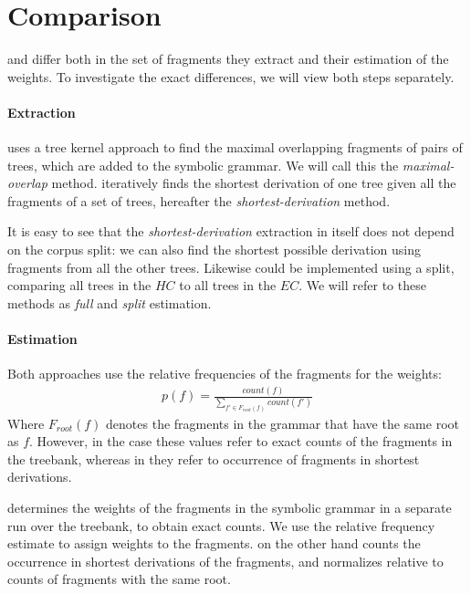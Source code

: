 
\section{Comparison} \label{sec:Comparison}
\dops{} and \ddop{} differ both in the set of fragments they extract and their estimation of the weights. To investigate the exact differences, we will view both steps separately.

\paragraph{Extraction}
\ddop{} uses a tree kernel approach to find the maximal overlapping fragments of pairs of trees, which are added to the symbolic grammar. We will call this the \emph{maximal-overlap} method. \dops{} iteratively finds the shortest derivation of one tree given all the fragments of a set of trees, hereafter the \emph{shortest-derivation} method. 

It is easy to see that the \emph{shortest-derivation} extraction in itself does not depend on the corpus split: we can also find the shortest possible derivation using fragments from all the other trees. Likewise \ddop{} could be implemented using a split, comparing all trees in the $HC$ to all trees in the $EC$.
We will refer to these methods as \emph{full} and \emph{split} estimation.

\paragraph{Estimation}

Both approaches use the relative frequencies of the fragments for the weights:
\begin{align}p(f)=\frac{count(f)}{\sum_{f'\in F_{root}(f)} count(f')}\end{align} 
Where $F_{root}(f)$ denotes the fragments in the grammar that have the same root as $f$.
However, in the \ddop{} case these values refer to exact counts of the fragments in the treebank, whereas in \dops{} they refer to occurrence of fragments in shortest derivations.


\ddop{} determines the weights of the fragments in the symbolic grammar in a separate run over the treebank, to obtain exact counts. We use the relative frequency estimate to assign weights to the fragments. \dops{} on the other hand counts the occurrence in shortest derivations of the fragments, and normalizes relative to counts of fragments with the same root.

